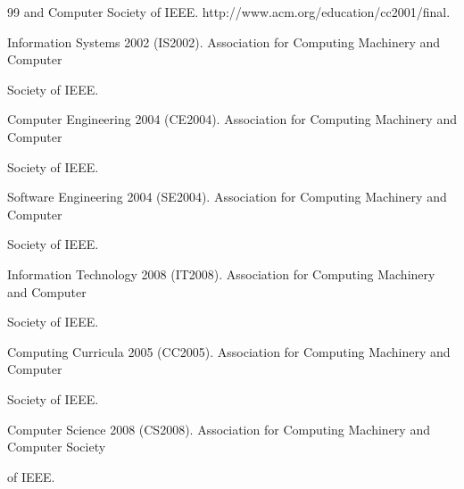 {{\begin{thebibliography}{99}
and Computer Society of IEEE. {\sf http://www.acm.org/education/cc2001/final}.
















Information Systems 2002 (IS2002). Association for Computing Machinery and Computer 

Society of IEEE. 




Computer Engineering 2004 (CE2004). Association for Computing Machinery and Computer 

Society of IEEE.


Software Engineering 2004 (SE2004). Association for Computing Machinery and Computer 

Society of IEEE.






Information Technology 2008 (IT2008). Association for Computing Machinery and Computer 

Society of IEEE.




Computing Curricula 2005 (CC2005). Association for Computing Machinery and Computer 

Society of IEEE.




Computer Science 2008 (CS2008). Association for Computing Machinery and Computer Society 

of IEEE.








\end{thebibliography}}}
